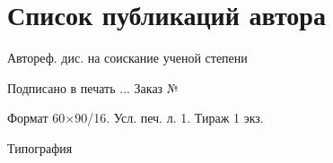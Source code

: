 \documentclass[a5paper,10pt,twoside,openany,article]{memoir}
\begin{document}
\mainmatter*                  %

\appendix
\section*{Список публикаций автора}
\begin{refsection}   
    \cite{nevinicaToplivnyyCiklLegkovodnogo2019,
    smirnovObogashchenieRegenerirovannogoUrana2018,
    smirnovApplyingEnrichmentCapacities2018,
    vantrodionova2019,
    smirnovMethodEnrichReprocessed2019,
    smirnovFizikotehnicheskieProblemyObogashcheniya2020,
    gusevMultycascadeEnrichmentSchemes2020,
    smirnovAnalysisEffectRestrictions2021,
    gusevProblemsReusingReprocessed2022}
\printbibliography[heading=subbibliography]
\end{refsection}

\newpage\thispagestyle{empty}

\vspace*{0pt plus1fill}

\small
\begin{center}
    \textit{\thesisAuthor}
    \par\medskip
    \thesisTitle
    \par\medskip

    Автореф. дис. на соискание ученой степени \thesisDegreeShort
    \par\bigskip

    Подписано в печать \blank[\widthof{999}].\blank[\widthof{999}].\blank[\widthof{99999}].
    Заказ № \blank[\widthof{999999999999}]

    Формат 60\(\times\)90/16. Усл. печ. л. 1. Тираж 1 экз.

    Типография \blank[0.5\linewidth]
\end{center}
\cleardoublepage
\end{document}

